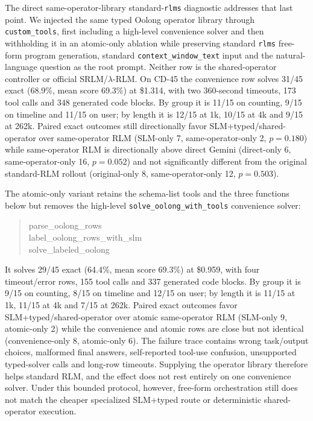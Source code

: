 The direct same-operator-library standard-\texttt{rlms} diagnostic addresses that last point. We injected the same typed Oolong operator library through \texttt{custom\_tools}, first including a high-level convenience solver and then withholding it in an atomic-only ablation while preserving standard \texttt{rlms} free-form program generation, standard \texttt{context\_window\_text} input and the natural-language question as the root prompt. Neither row is the shared-operator controller or official SRLM/$\lambda$-RLM. On CD-45 the convenience row solves 31/45 exact (68.9\%, mean score 69.3\%) at \$1.314, with two 360-second timeouts, 173 tool calls and 348 generated code blocks. By group it is 11/15 on counting, 9/15 on timeline and 11/15 on user; by length it is 12/15 at 1k, 10/15 at 4k and 9/15 at 262k. Paired exact outcomes still directionally favor SLM+typed/shared-operator over same-operator RLM (SLM-only 7, same-operator-only 2, $p=0.180$) while same-operator RLM is directionally above direct Gemini (direct-only 6, same-operator-only 16, $p=0.052$) and not significantly different from the original standard-RLM rollout (original-only 8, same-operator-only 12, $p=0.503$).

The atomic-only variant retains the schema-list tools and the three functions below but removes the high-level \texttt{solve\_oolong\_with\_tools} convenience solver:
\begin{quote}
\small\ttfamily
parse\_oolong\_rows\\[-1pt]
label\_oolong\_rows\_with\_slm\\[-1pt]
solve\_labeled\_oolong
\end{quote}
It solves 29/45 exact (64.4\%, mean score 69.3\%) at \$0.959, with four timeout/error rows, 155 tool calls and 337 generated code blocks. By group it is 9/15 on counting, 8/15 on timeline and 12/15 on user; by length it is 11/15 at 1k, 11/15 at 4k and 7/15 at 262k. Paired exact outcomes favor SLM+typed/shared-operator over atomic same-operator RLM (SLM-only 9, atomic-only 2) while the convenience and atomic rows are close but not identical (convenience-only 8, atomic-only 6). The failure trace contains wrong task/output choices, malformed final answers, self-reported tool-use confusion, unsupported typed-solver calls and long-row timeouts. Supplying the operator library therefore helps standard RLM, and the effect does not rest entirely on one convenience solver. Under this bounded protocol, however, free-form orchestration still does not match the cheaper specialized SLM+typed route or deterministic shared-operator execution.


